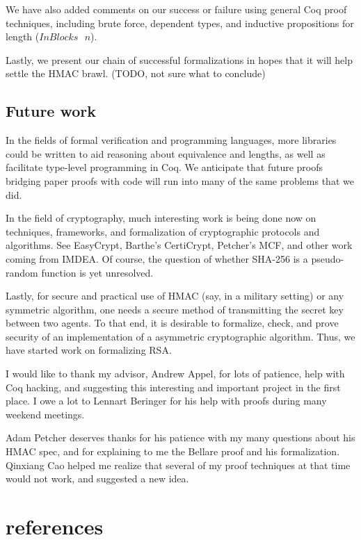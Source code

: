 \documentclass[twocolumn,showpacs,%
  nofootinbib,aps,superscriptaddress,%
  eqsecnum,prd,notitlepage,showkeys,10pt]{revtex4-1}
\newcommand{\s} {\textrm{ }}
\begin{document}
We have also added comments on our success or failure using general Coq proof techniques, including brute force, dependent types, and inductive propositions for length ($InBlocks \s n$).

Lastly, we present our chain of successful formalizations in hopes that it will help settle the HMAC brawl. (TODO, not sure what to conclude)

\subsection{Future work}

In the fields of formal verification and programming languages, more libraries could be written to aid reasoning about equivalence and lengths, as well as facilitate type-level programming in Coq. We anticipate that future proofs bridging paper proofs with code will run into many of the same problems that we did.

In the field of cryptography, much interesting work is being done now on techniques, frameworks, and formalization of cryptographic protocols and algorithms. See EasyCrypt, Barthe's CertiCrypt, Petcher's MCF, and other work coming from IMDEA. Of course, the question of whether SHA-256 is a pseudo-random function is yet unresolved.

Lastly, for secure and practical use of HMAC (say, in a military setting) or any symmetric algorithm, one needs a secure method of transmitting the secret key between two agents. To that end, it is desirable to formalize, check, and prove security of an implementation of a asymmetric cryptographic algorithm. Thus, we have started work on formalizing RSA.

\begin{acknowledgments}

I would like to thank my advisor, Andrew Appel, for lots of patience, help with Coq hacking, and suggesting this interesting and important project in the first place. I owe a lot to Lennart Beringer for his help with proofs during many weekend meetings.

Adam Petcher deserves thanks for his patience with my many questions about his HMAC spec, and for explaining to me the Bellare proof and his formalization. Qinxiang Cao helped me realize that several of my proof techniques at that time would not work, and suggested a new idea.

\end{acknowledgments}

\section{references}
\end{document}
